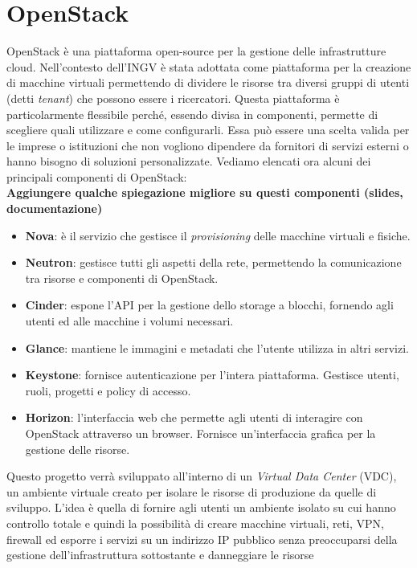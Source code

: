 \section{OpenStack}
OpenStack è una piattaforma open-source per la gestione delle infrastrutture cloud. Nell'contesto dell'INGV è stata adottata come piattaforma per la creazione di
macchine virtuali permettendo di dividere le risorse tra diversi gruppi di utenti (detti \textit{tenant}) che possono essere i ricercatori.
Questa piattaforma è particolarmente flessibile perché, essendo divisa in componenti, permette di scegliere quali utilizzare e come configurarli. Essa può essere
una scelta valida per le imprese o istituzioni che non vogliono dipendere da fornitori di servizi esterni o hanno bisogno di soluzioni personalizzate.
Vediamo elencati ora alcuni dei principali componenti di OpenStack\cite{amslaurea29330}:
\\
\textbf{Aggiungere qualche spiegazione migliore su questi componenti (slides, documentazione)}
\\
\begin{itemize}
    \item \textbf{Nova}: è il servizio che gestisce il \textit{provisioning} delle macchine virtuali e fisiche. 
    \item \textbf{Neutron}: gestisce tutti gli aspetti della rete, permettendo la comunicazione tra risorse e componenti di OpenStack. 
    \item \textbf{Cinder}: espone l'API per la gestione dello storage a blocchi, fornendo agli utenti ed alle macchine i volumi necessari.
    \item \textbf{Glance}: mantiene le immagini e metadati che l'utente utilizza in altri servizi. 
    \item \textbf{Keystone}: fornisce autenticazione per l'intera piattaforma. Gestisce utenti, ruoli, progetti e policy di accesso.
    \item \textbf{Horizon}: l'interfaccia web che permette agli utenti di interagire con OpenStack attraverso un browser. Fornisce un'interfaccia grafica per la gestione delle risorse.
\end{itemize}
Questo progetto verrà sviluppato all'interno di un \textit{Virtual Data Center} (VDC), un ambiente virtuale creato per isolare le risorse di produzione
da quelle di sviluppo. L'idea è quella di fornire agli utenti un ambiente isolato su cui hanno controllo totale e quindi la possibilità di creare macchine virtuali,
reti, VPN, firewall ed esporre i servizi su un indirizzo IP pubblico senza preoccuparsi della gestione dell'infrastruttura sottostante e danneggiare le risorse
